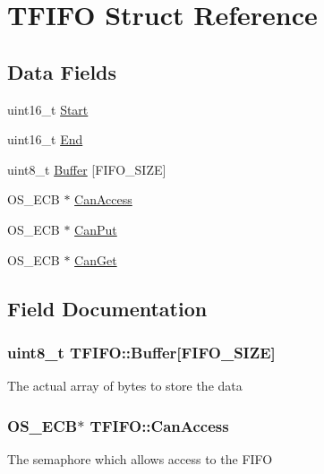 \hypertarget{struct_t_f_i_f_o}{}\section{T\+F\+I\+F\+O Struct Reference}
\label{struct_t_f_i_f_o}
\subsection*{Data Fields}
\begin{DoxyCompactItemize}
\item 
uint16\+\_\+t \hyperlink{struct_t_f_i_f_o_a092a7559431a12616672354641908167}{Start}
\item 
uint16\+\_\+t \hyperlink{struct_t_f_i_f_o_a5063b875898a6f23a97aa3ca17f0544b}{End}
\item 
uint8\+\_\+t \hyperlink{struct_t_f_i_f_o_a5a9d712880dc4f1d5571b96452cd85f8}{Buffer} \mbox{[}F\+I\+F\+O\+\_\+\+S\+I\+Z\+E\mbox{]}
\item 
O\+S\+\_\+\+E\+C\+B $\ast$ \hyperlink{struct_t_f_i_f_o_ae08fd55cef4bdad0b4fae1c28110b34d}{Can\+Access}
\item 
O\+S\+\_\+\+E\+C\+B $\ast$ \hyperlink{struct_t_f_i_f_o_a9f4fd72a0313ed8a98e22198171c2fc5}{Can\+Put}
\item 
O\+S\+\_\+\+E\+C\+B $\ast$ \hyperlink{struct_t_f_i_f_o_a1a71a4db58cc625d3160889d91a33125}{Can\+Get}
\end{DoxyCompactItemize}


\subsection{Field Documentation}
\hypertarget{struct_t_f_i_f_o_a5a9d712880dc4f1d5571b96452cd85f8}{}
\subsubsection[{Buffer}]{\setlength{\rightskip}{0pt plus 5cm}uint8\+\_\+t T\+F\+I\+F\+O\+::\+Buffer\mbox{[}F\+I\+F\+O\+\_\+\+S\+I\+Z\+E\mbox{]}}\label{struct_t_f_i_f_o_a5a9d712880dc4f1d5571b96452cd85f8}
The actual array of bytes to store the data \hypertarget{struct_t_f_i_f_o_ae08fd55cef4bdad0b4fae1c28110b34d}{}
\subsubsection[{Can\+Access}]{\setlength{\rightskip}{0pt plus 5cm}O\+S\+\_\+\+E\+C\+B$\ast$ T\+F\+I\+F\+O\+::\+Can\+Access}\label{struct_t_f_i_f_o_ae08fd55cef4bdad0b4fae1c28110b34d}
The semaphore which allows access to the F\+I\+F\+O \hypertarget{struct_t_f_i_f_o_a1a71a4db58cc625d3160889d91a33125}{}
